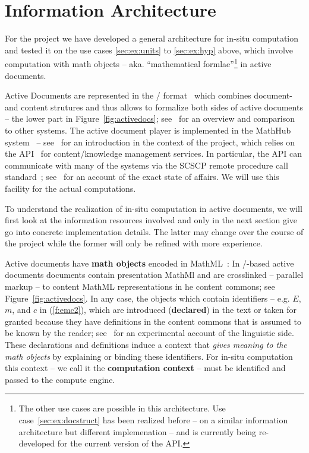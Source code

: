 \section{Information Architecture}\label{sec:infarch}

For the \pn project we have developed a general architecture for in-situ computation and
tested it on the use cases \ref{sec:ex:units} to \ref{sec:ex:hyp} above, which involve
computation with math objects -- aka. ``mathematical formlae''\footnote{The other use
  cases are possible in this architecture. Use case~\ref{sec:ex:docstruct} has been
  realized before -- on a similar information architecture but different implemenation --
  and is currently being re-developed for the current version of the \mmt API.} in active
documents.

Active Documents are represented in the \omdoc/\mmt
format~\cite{Kohlhase:OMDoc1.2,uniformal:on,Iancu:phd} which combines document- and
content strutures and thus allows to formalize both sides of active documents -- the lower
part in Figure~\ref{fig:activedocs}; see~ for an overview and comparison to
other \pn systems. The active document player is implemented in the MathHub
system~\cite{MathHub:on} -- see~\cite{ODK-D4.3} for an introduction in the context of the
\pn project, which relies on the \mmt API~\cite{Rabe:MAGMS13,uniformal:on} for
content/knowledge management services. In particular, the \mmt API can communicate with
many of the \pn systems via the SCSCP remote procedure call
standard~\cite{HHKLRAT:SCSCP10}; see~\cite{ODK-D3.3} for an account of the exact state of
affairs. We will use this facility for the actual computations.

To understand the realization of in-situ computation in active documents, we will first
look at the information resources involved and only in the next section give go into
concrete implementation details. The latter may change over the course of the \pn project
while the former will only be refined with more experience.

Active documents have \textbf{math objects} encoded in
MathML~\cite{CarlisleEd:MathML3:base}: In \omdoc/\mmt-based active documents documents
contain presentation MathMl and are crosslinked -- parallel markup -- to content MathML
representations in he content commons; see Figure~\ref{fig:activedocs}. In any case, the
objects which contain identifiers -- e.g. $E$, $m$, and $c$ in (\ref{f:emc2}), which are
introduced (\textbf{declared}) in the text or taken for granted because they have
definitions in the content commons that is assumed to be known by the reader;
see~\cite{WolGriKoh:udc11} for an experimental account of the linguistic side. These
declarations and definitions induce a context that \emph{gives meaning to the math
  objects} by explaining or binding these identifiers. For in-situ computation this
context -- we call it the \textbf{computation context} -- must be identified and passed to
the compute engine.

